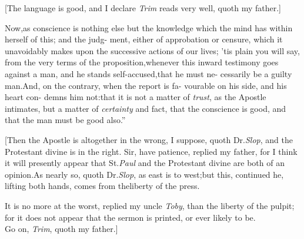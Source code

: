 \documentclass{article}
\begin{document}
[The language is good, and I declare \textit{Trim} reads very
well, quoth my father.]

\lqq Now,\tsk as conscience is nothing else\break
\lqq but the knowledge which the mind has\break
\lqq within herself of this; and the judg-\break
\lqq ment, either of approbation or censure,\break
\lqq which it unavoidably makes upon the\break
\lqq successive actions of our lives; ’tis plain\break
\lqq you will say, from the very terms of\break
\lqq the proposition,\tsk whenever this inward\break
\lqq testimony goes against a man, and he\break
\lqq stands self-accused,\tsk that he must ne-\break
\lqq cessarily be a guilty man.\tsk And, on\break
\lqq the contrary, when the report is fa-\break
\lqq vourable on his side, and his heart con-
\lqq demns him not:\tsh that it is not a\break
\lqq matter of \textit{trust}, as the Apostle intimates,\break
\lqq \tsk but a matter of \textit{certainty} and fact,\break
\lqq that the conscience is good, and that\break
\lqq the man must be good also.”

[Then the Apostle is altogether in the wrong, I suppose, quoth
Dr.\@ \textit{Slop}, and the Protestant divine is in the right. Sir,
have patience, replied my father, for I think it will presently
appear that St.\@ \textit{Paul} and the Protestant divine are both of
an opinion.\tsk As nearly so, quoth Dr.\@ \textit{Slop}, as east is
to west;\tsk but this, continued he, lifting both hands, comes
from the\break liberty of the press.

It is no more at the worst, replied my uncle \textit{Toby}, than
the liberty of the pulpit; for it does not appear that the sermon is
printed, or ever likely to be.\\
\newpage
Go on, \textit{Trim}, quoth my father.]
\end{document}
